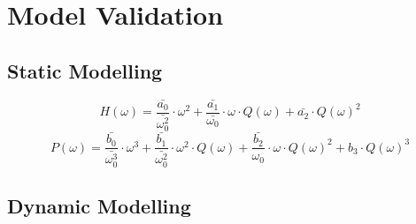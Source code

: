 \chapter{Model Validation}\label{ch:modValPerf}
\section{Static Modelling}

\begin{equation}
	H(\omega) = \frac{\bar{a_0}}{\bar{\omega_0^2}} \cdot \omega^2 + \frac{\bar{a_1}}{\bar{\omega_0}} \cdot \omega \cdot Q(\omega) + \bar{a_2} \cdot Q(\omega)^2
	\label{eq:pumpHeadModel60}
\end{equation}
\begin{equation}
	P(\omega) = \frac{\bar{b_0}}{\bar{\omega_0^3}} \cdot \omega^3 + \frac{\bar{b_1}}{\bar{\omega_0^2}} \cdot \omega^2 \cdot Q(\omega) + \frac{\bar{b_2}}{\omega_0} \cdot \omega \cdot Q(\omega)^2 + b_3 \cdot Q(\omega)^3
	\label{eq:pumpPowerModel60}
\end{equation}

\section{Dynamic Modelling}